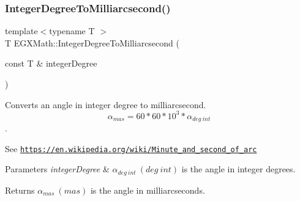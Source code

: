 \subsubsection{\texorpdfstring{Integer\+Degree\+To\+Milliarcsecond()}{IntegerDegreeToMilliarcsecond()}}
{\footnotesize\ttfamily template$<$typename T $>$ \\
T E\+G\+X\+Math\+::\+Integer\+Degree\+To\+Milliarcsecond (\begin{DoxyParamCaption}\item[{const T \&}]{integer\+Degree }\end{DoxyParamCaption})}



Converts an angle in integer degree to milliarcsecond. \[\alpha_{mas}=60 * 60 * 10^3 * \alpha_{deg\ int} \]. 

See \href{https://en.wikipedia.org/wiki/Minute_and_second_of_arc}{\tt https\+://en.\+wikipedia.\+org/wiki/\+Minute\+\_\+and\+\_\+second\+\_\+of\+\_\+arc} 
\begin{DoxyParams}{Parameters}
{\em integer\+Degree} & $\alpha_{deg\ int}\ (deg\ int)$ is the angle in integer degrees. \\
\hline
\end{DoxyParams}
\begin{DoxyReturn}{Returns}
$\alpha_{mas}\ (mas)$ is the angle in milliarcseconds. 
\end{DoxyReturn}
